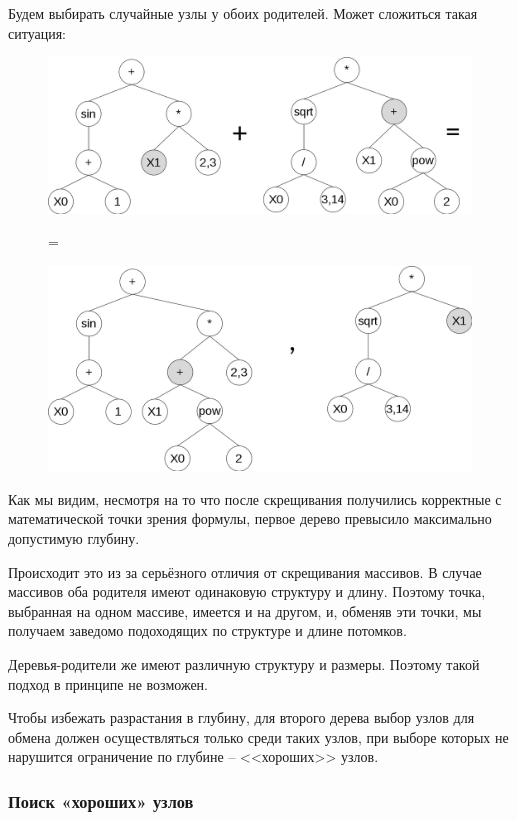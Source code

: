 Будем выбирать случайные узлы у обоих родителей. Может сложиться такая ситуация:

\clearpage
\begin{figure}[!h]
\centering
\includegraphics[scale=0.5]{research/pics/4.png}

=

\includegraphics[scale=0.5]{research/pics/5.png}
\label{figure:crossoverOverflow}
\end{figure}

Как мы видим, несмотря на то что после скрещивания получились корректные с математической точки зрения формулы, первое дерево превысило максимально допустимую глубину.

Происходит это из за серьёзного отличия от скрещивания массивов. В случае массивов  оба родителя имеют одинаковую структуру и длину. Поэтому точка, выбранная на одном массиве, имеется и на другом, и, обменяв эти точки, мы получаем заведомо подоходящих по структуре и длине потомков. 

Деревья-родители же имеют различную структуру и размеры. Поэтому такой подход в принципе не возможен. 

Чтобы избежать разрастания в глубину, для второго дерева выбор узлов для обмена должен осуществляться только среди таких узлов, при выборе которых не нарушится ограничение по глубине -- <<хороших>> узлов.

\subsubsection{Поиск «хороших» узлов}

